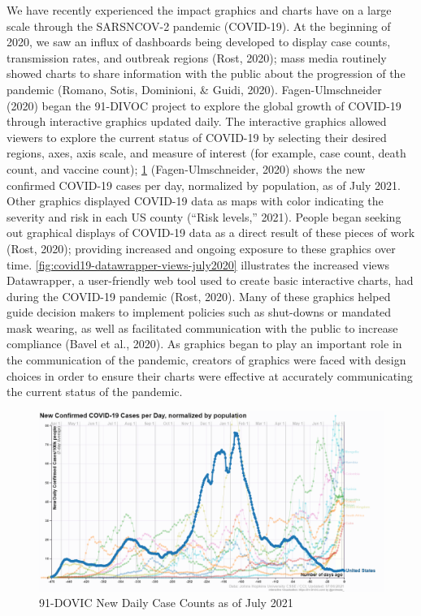 \documentclass[print]{nuthesis}
\begin{document}
We have recently experienced the impact graphics and charts have on a large scale through the SARSNCOV-2 pandemic (COVID-19).
At the beginning of 2020, we saw an influx of dashboards being developed to display case counts, transmission rates, and outbreak regions (Rost, 2020); mass media routinely showed charts to share information with the public about the progression of the pandemic (Romano, Sotis, Dominioni, \& Guidi, 2020).
Fagen-Ulmschneider (2020) began the 91-DIVOC project to explore the global growth of COVID-19 through interactive graphics updated daily.
The interactive graphics allowed viewers to explore the current status of COVID-19 by selecting their desired regions, axes, axis scale, and measure of interest (for example, case count, death count, and vaccine count); \cref{fig:91divoc-cases-july2021} (Fagen-Ulmschneider, 2020) shows the new confirmed COVID-19 cases per day, normalized by population, as of July 2021.
Other graphics displayed COVID-19 data as maps  with color indicating the severity and risk in each US county ({``Risk levels,''} 2021).
People began seeking out graphical displays of COVID-19 data as a direct result of these pieces of work (Rost, 2020); providing increased and ongoing exposure to these graphics over time.
\cref{fig:covid19-datawrapper-views-july2020} illustrates the increased views Datawrapper, a user-friendly web tool used to create basic interactive charts, had during the COVID-19 pandemic (Rost, 2020).
Many of these graphics helped guide decision makers to implement policies such as shut-downs or mandated mask wearing, as well as facilitated communication with the public to increase compliance (Bavel et al., 2020).
As graphics began to play an important role in the communication of the pandemic, creators of graphics were faced with design choices in order to ensure their charts were effective at accurately communicating the current status of the pandemic.

\begin{figure}[tbp]

{\centering \includegraphics[width=1\linewidth,]{images/91dovic-cases-july2021} 

}

\caption{91-DOVIC New Daily Case Counts as of July 2021}\label{fig:91divoc-cases-july2021}
\end{figure}
\end{document}
